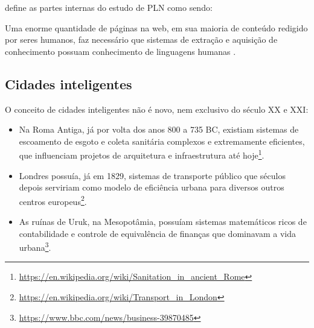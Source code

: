  define as partes internas do estudo de PLN como sendo:

\begin{quote}
\end{quote}

Uma enorme quantidade de páginas na web, em sua maioria de conteúdo redigido por seres humanos, faz necessário que sistemas de extração e aquisição de conhecimento possuam conhecimento de linguagens humanas \cite{inteligencia-artificial}.

\subsection{Cidades inteligentes} \label{ss:cidades_inteligentes}

O conceito de cidades inteligentes não é novo, nem exclusivo do século XX e XXI:

\begin{itemize}
    \item Na Roma Antiga, já por volta dos anos 800 a 735 BC, existiam sistemas de escoamento de esgoto e coleta sanitária complexos e extremamente eficientes, que influenciam projetos de arquitetura e infraestrutura até hoje\footnote{\url{https://en.wikipedia.org/wiki/Sanitation_in_ancient_Rome}}.
    
    \item Londres possuía, já em 1829, sistemas de transporte público que séculos depois serviriam como modelo de eficiência urbana para diversos outros centros europeus\footnote{\url{https://en.wikipedia.org/wiki/Transport_in_London}}.
    
    \item As ruínas de Uruk, na Mesopotâmia, possuíam sistemas matemáticos ricos de contabilidade e controle de equivalência de finanças que dominavam a vida urbana\footnote{\url{https://www.bbc.com/news/business-39870485}}.
\end{itemize}

